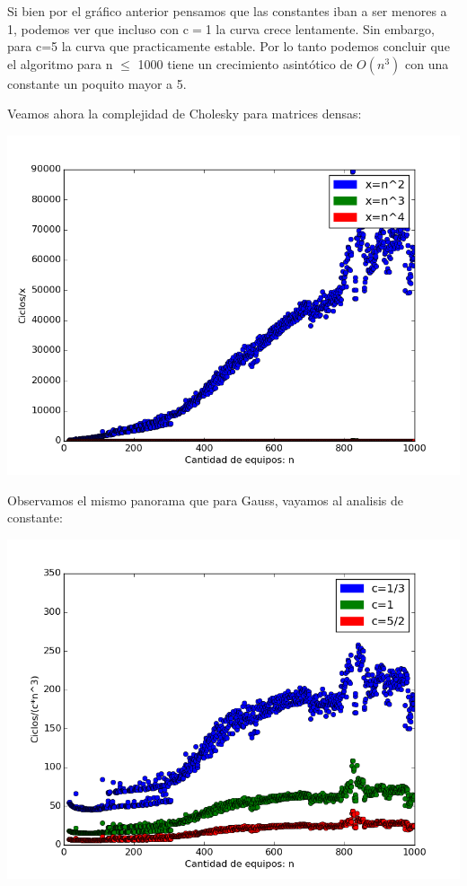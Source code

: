  Si bien por el gráfico anterior pensamos que las constantes iban a ser menores a 1, podemos ver que incluso con c$=$1 la curva crece lentamente. Sin embargo, para c=5 la curva que practicamente estable.
 Por lo tanto podemos concluir que el algoritmo para n $\leq$ 1000 tiene un crecimiento asintótico de $O(n^3)$ con una constante un poquito mayor a 5.

 Veamos ahora la complejidad de Cholesky para matrices densas:
 
  \includegraphics[scale=0.7]{img/complejidadcholesky.png}
  
 Observamos el mismo panorama que para Gauss, vayamos al analisis de constante:
 
  \includegraphics[scale=0.7]{img/constantecholesky.png}
  
